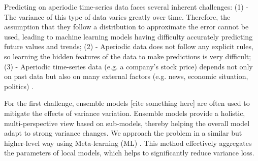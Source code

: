 \documentclass[aps,prb,groupedaddress,twocolumn,showpacs,dvipdfmx,superscriptaddress,pdftex]{revtex4-2}
\begin{document}
Predicting on aperiodic time-series data faces several inherent challenges: (1) - The variance of this type of data varies greatly over time. Therefore, the assumption that they follow a distribution to approximate the error cannot be used, leading to machine learning models having difficulty accurately predicting future values and trends; (2) - Aperiodic data does not follow any explicit rules, so learning the hidden features of the data to make predictions is very difficult; (3) - Aperiodic time-series data (e.g. a company's stock price) depends not only on past data but also on many external factors (e.g. news, economic situation, politics) \cite{li2019multi}.

\vspace{2mm}


For the first challenge, ensemble models [cite something here] are often used to mitigate the effects of variance variation. Ensemble models provide a holistic, multi-perspective view based on sub-models, thereby helping the overall model adapt to strong variance changes. We approach the problem in a similar but higher-level way using Meta-learning (ML) \cite{finn2017model}. This method effectively aggregates the parameters of local models, which helps to significantly reduce variance loss.

\vspace{2mm}

\end{document}
